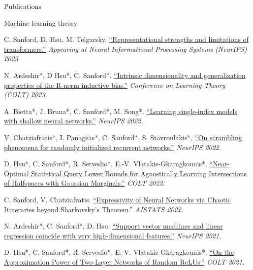 \documentclass{resume} %
\begin{document}
\begin{rSection}{Publications}
\begin{rSubsection}{Machine learning theory}{}{}{}{}
\item C. Sanford, D. Hsu, M. Telgarsky. \href{https://arxiv.org/abs/2306.02896}{``Representational strengths and limitations of transformers.''} \textit{Appearing at Neural Informational Processing Systems (NeurIPS) 2023.}

\item N. Ardeshir*, D Hsu*, C. Sanford*. \href{https://proceedings.mlr.press/v195/ardeshir23a.html}{``Intrinsic dimensionality and generalization properties of the R-norm inductive bias.''} \textit{Conference on Learning Theory (COLT) 2023.}

\item A. Bietta*, J. Bruna*, C. Sanford*, M. Song*. \href{https://proceedings.neurips.cc/paper_files/paper/2022/hash/3fb6c52aeb11e09053c16eabee74dd7b-Abstract-Conference.html}{``Learning single-index models with shallow neural networks.''} \textit{NeurIPS 2022.}

\item V. Chatziafratis*, I. Panageas*, C. Sanford*, S. Stavroulakis*. \href{https://proceedings.neurips.cc/paper_files/paper/2022/hash/755acd0c7c07180d78959b6d89768207-Abstract-Conference.html}{``On scrambling phenomena for randomly initialized recurrent networks.''} \textit{NeurIPS 2022.}

\item D. Hsu*, C. Sanford*, R. Servedio*, E.-V. Vlatakis-Gkaragkounis*. \href{https://proceedings.mlr.press/v178/hsu22a.html}{``Near-Optimal Statistical Query Lower Bounds for Agnostically Learning Intersections of Halfspaces with Gaussian Marginals.''} \textit{COLT 2022.}

\item C. Sanford, V. Chatziafratis. \href{https://proceedings.mlr.press/v151/sanford22a.html}{``Expressivity of Neural Networks via Chaotic Itineraries beyond Sharkovsky's Theorem.''} \textit{AISTATS 2022.}

\item N. Ardeshir*, C. Sanford*, D. Hsu. \href{https://proceedings.neurips.cc/paper/2021/hash/26d4b4313a7e5828856bc0791fca39a2-Abstract.html}{``Support vector machines and linear regression coincide with very high-dimensional features.''} \textit{NeurIPS 2021.}

\item D. Hsu*, C. Sanford*, R. Servedio*, E.-V. Vlatakis-Gkaragkounis*. \href{https://proceedings.mlr.press/v134/hsu21a.html}{``On the Approximation Power of Two-Layer Networks of Random ReLUs.''} \textit{COLT 2021.}
\end{rSubsection}


\end{rSection}
\end{document}
